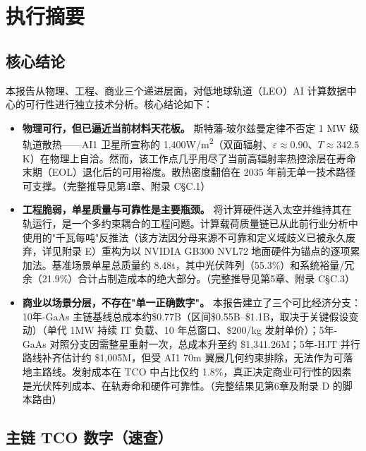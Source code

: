 
\section*{执行摘要}

\subsection*{核心结论}

本报告从物理、工程、商业三个递进层面，对低地球轨道（LEO）AI 计算数据中心的可行性进行独立技术分析。核心结论如下：

\begin{itemize}[leftmargin=*]
    \item \textbf{物理可行，但已逼近当前材料天花板。} 斯特藩-玻尔兹曼定律不否定 1 MW 级轨道散热——AI1 卫星所宣称的 1,400\;W/m\textsuperscript{2}（双面辐射、$\varepsilon\approx0.90$、$T\approx342.5$\;K）在物理上自洽。然而，该工作点几乎用尽了当前高辐射率热控涂层在寿命末期（EOL）退化后的可用裕度。散热密度翻倍在 2035 年前无单一技术路径可支撑。（完整推导见第4章、附录 C\;\S C.1）

    \item \textbf{工程脆弱，单星质量与可靠性是主要瓶颈。} 将计算硬件送入太空并维持其在轨运行，是一个多约束耦合的工程问题。计算载荷质量链已从此前行业分析中使用的"千瓦每吨"反推法（该方法因分母来源不可靠和定义域歧义已被永久废弃，详见附录 E）重构为以 NVIDIA GB300 NVL72 地面硬件为锚点的逐项累加法。基准场景单星总质量约 8.48\;t，其中光伏阵列（55.3\%）和系统裕量/冗余（21.9\%）合计占制造成本的绝大部分。（完整推导见第5章、附录 C\;\S C.3）

    \item \textbf{商业以场景分层，不存在"单一正确数字"。} 本报告建立了三个可比经济分支：10年-GaAs 主链基线总成本约\$0.77B（区间\$0.55B--\$1.1B，取决于关键假设变动）（单代 1\;MW 持续 IT 负载、10 年总窗口、\$200/kg 发射单价）；5年-GaAs 对照分支因需整星重射一次，总成本升至约 \$1,341.26M；5年-HJT 并行路线补齐估计约 \;\$1,005M，但受 AI1 70\;m 翼展几何约束排除，无法作为可落地主路线。发射成本在 TCO 中占比仅约 1.8\%，真正决定商业可行性的因素是光伏阵列成本、在轨寿命和硬件可靠性。（完整结果见第6章及附录 D 的脚本路由）
\end{itemize}

\subsection*{主链 TCO 数字（速查）}

